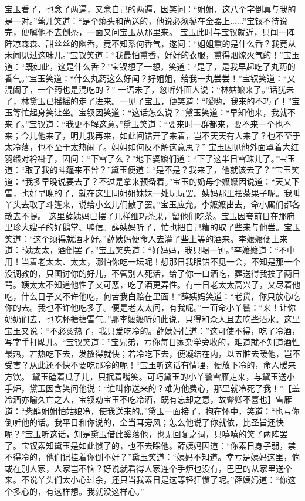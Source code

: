 \documentclass[12pt,oneside]{book}
\begin{document}
宝玉看了，也念了两遍，又念自己的两遍，因笑问：“姐姐，这八个字倒真与我的是一对。”莺儿笑道：“是个癞头和尚送的，他说必须錾在金器上......”宝钗不待说完，便嗔他不去倒茶，一面又问宝玉从那里来。
宝玉此时与宝钗就近，只闻一阵阵凉森森、甜丝丝的幽香，竟不知系何香气，遂问：“姐姐熏的是什么香？我竟从未闻见过这味儿。”宝钗笑道：“我最怕熏香，好好的衣服，熏得烟燎火气的！”宝玉道：“既如此，这是什么香？”宝钗想了一想，笑道：“是了，是我早起吃了丸药的香气。”宝玉笑道：“什么丸药这么好闻？好姐姐，给我一丸尝尝！”宝钗笑道：“又混闹了，一个药也是混吃的？”
一语未了，忽听外面人说：“林姑娘来了。”话犹未了，林黛玉已摇摇的走了进来。一见了宝玉，便笑道：“嗳哟，我来的不巧了！”宝玉等忙起身笑让坐。宝钗因笑道：“这话怎么说？”黛玉笑道：“早知他来，我就不来了。”宝钗道：“我更不解这意。”黛玉笑道：“要来时一群都来，要不来一个也不来；今儿他来了，明儿我再来，如此间错开了来着，岂不天天有人来了？也不至于太冷落，也不至于太热闹了。姐姐如何反不解这意思？”
宝玉因见他外面罩着大红羽缎对衿褂子，因问：“下雪了么？”地下婆娘们道：“下了这半日雪珠儿了。”宝玉道：“取了我的斗篷来不曾？”黛玉便道：“是不是？我来了，他就该去了？”宝玉笑道：“我多早晚说要去了？不过是拿来预备着。”宝玉的奶母李嬷嬷因说道：“天又下雪，也好早晚的了，就在这里同姐姐妹妹一处玩玩罢。姨妈那里摆茶果子呢。我叫丫头去取了斗篷来，说给小幺儿们散了罢。”宝玉应允。李嬷嬷出去，命小厮们都各散去不提。
这里薛姨妈已摆了几样细巧茶果，留他们吃茶。宝玉因夸前日在那府里珍大嫂子的好鹅掌、鸭信。薛姨妈听了，忙也把自己糟的取了些来与他尝。宝玉笑道：“这个须得就酒才好。”薛姨妈便命人去灌了些上等的酒来。李嬷嬷便上来道：“姨太太，酒倒罢了。”宝玉笑央道：“好妈妈，我只喝一钟。”李嬷嬷道：“不中用！当着老太太、太太，哪怕你吃一坛呢！想那日我眼错不见一会，不知是那一个没调教的，只图讨你的好儿，不管别人死活，给了你一口酒吃，葬送得我挨了两日骂。姨太太不知道他性子又可恶，吃了酒更弄性。有一日老太太高兴了，又尽着他吃，什么日子又不许他吃，何苦我白赔在里面！”薛姨妈笑道：“老货，你只放心吃你的去。我也不许他吃多了。便是老太太问，有我呢。”一面命小丫鬟：“来！让你奶奶们去，也吃杯搪搪雪气。”那李嬷嬷听如此说，只得和众人且去吃些酒水。这里宝玉又说：“不必烫热了，我只爱吃冷的。薛姨妈忙道：”这可使不得，吃了冷酒，写字手打飐儿。“宝钗笑道：”宝兄弟，亏你每日家杂学旁收的，难道就不知道酒性最热，若热吃下去，发散得就快；若冷吃下去，便凝结在内，以五脏去暖他，岂不受害？从此还不快不要吃那冷的呢！“宝玉听这话有情理，便放下冷的，命人暖来方饮。
黛玉磕着瓜子儿，只抿着嘴笑。可巧黛玉的小丫鬟雪雁走来，与黛玉送小手炉，黛玉因含笑问他说：“谁叫你送来的？难为他费心，那里就冷死了我！”【盖冷酒亦喻久亡之人，宝钗劝宝玉不吃冷酒，既有忘却之意，故颦卿不喜也】雪雁道：“紫鹃姐姐怕姑娘冷，使我送来的。”黛玉一面接了，抱在怀中，笑道：“也亏你倒听他的话。我平日和你说的，全当耳旁风；怎么他说了你就依，比圣旨还快呢？”宝玉听这话，知是黛玉借此奚落他，也无回复之词，只嘻嘻的笑了两阵罢了。宝钗素知黛玉是如此惯了的，也不去睬他。薛姨妈因道：“你素日身子弱，禁不得冷的，他们记挂着你倒不好？”黛玉笑道：“姨妈不知道。幸亏是姨妈这里，倘或在别人家，人家岂不恼？好说就看得人家连个手炉也没有，巴巴的从家里送个来。不说丫头们太小心过余，还只当我素日是这等轻狂惯了呢。”薛姨妈道：“你这个多心的，有这样想。我就没这样心。”
\end{document}

